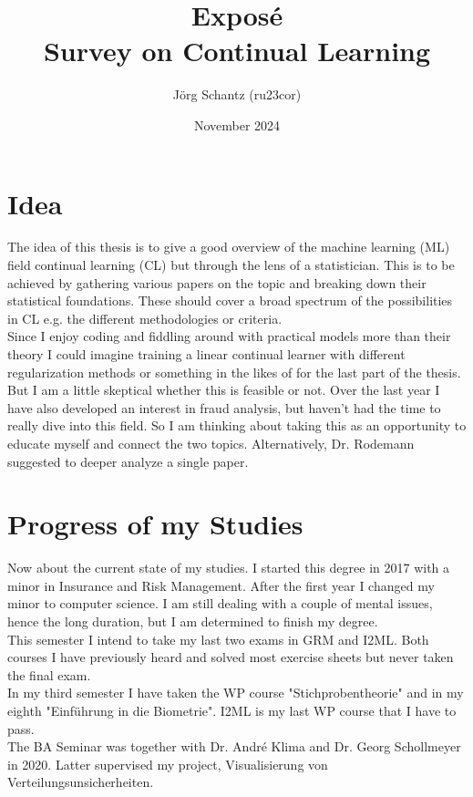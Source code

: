\documentclass[12pt, a4paper]{report}
\title{Exposé\\
	\Large{Survey on Continual Learning}}
\author{Jörg Schantz (ru23cor)}
\date{November 2024}
\begin{document}
	\maketitle
	\renewcommand{\labelenumii}{\arabic{enumi}.\arabic{enumii}}
	\renewcommand{\labelenumiii}{\arabic{enumi}.\arabic{enumii}.\arabic{enumiii}}
	\renewcommand{\labelenumiv}{\arabic{enumi}.\arabic{enumii}.arabic{enumiii}.\arabic{enumiv}}
\section*{Idea}
	The idea of this thesis is to give a good overview of the machine learning (ML) field continual learning (CL) but through the lens of a statistician. This is to be achieved by gathering various papers on the topic and breaking down their statistical foundations. These should cover a broad spectrum of the possibilities in CL e.g. the different methodologies or criteria.\\
	Since I enjoy coding and fiddling around with practical models more than their theory I could imagine training a linear continual learner with different regularization methods or something in the likes of for the last part of the thesis. But I am a little skeptical whether this is feasible or not. Over the last year I have also developed an interest in fraud analysis, but haven't had the time to really dive into this field. So I am thinking about taking this as an opportunity to educate myself and connect the two topics. Alternatively, Dr. Rodemann suggested to deeper analyze a single paper.\\
\section*{Progress of my Studies}
	Now about the current state of my studies. I started this degree in	2017 with a minor in Insurance and Risk Management. After the first year I changed my minor to computer science. I am still dealing with a couple of mental issues, hence the long duration, but I am determined to finish my degree.\\
	This semester I intend to take my last two exams in GRM and I2ML. Both courses I have previously heard and solved most exercise sheets but never taken the final exam.\\
	In my third semester I have taken the WP course "Stichprobentheorie" and in my eighth "Einführung in die Biometrie". I2ML is my last WP course that I have to pass.\\
	The BA Seminar was together with Dr. André Klima and Dr. Georg Schollmeyer in 2020. Latter supervised my project, Visualisierung von Verteilungsunsicherheiten.
\end{document}
